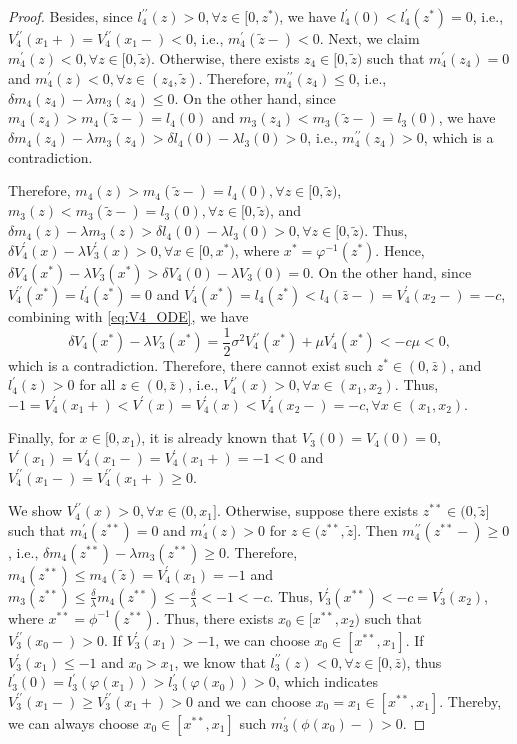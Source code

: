 \documentclass[11pt,reqno]{article}%
\numberwithin{equation}{section}
\begin{document}
\begin{proof}
Besides, since $l_4^{\prime\prime}(z)>0, \forall z\in[0,z^*)$, we have $l_4^{\prime}(0)<l_4^{\prime}(z^*)=0$, i.e., $V_4^{\prime\prime}(x_1+)=V_4^{\prime\prime}(x_1-)<0$, i.e., $m^\prime_4(\tilde z-)<0$. Next, we claim $m^\prime_4(z)<0, \forall z\in[0,\tilde z)$. Otherwise, there exists $z_4\in[0,\tilde z)$ such that $m_4^\prime(z_4)=0$ and $m_4^\prime(z)<0, \forall z\in(z_4,\tilde z)$. Therefore, $m_4^{\prime\prime}(z_4)\le 0$, i.e., $\delta m_4(z_4)-\lambda m_3(z_4)\le 0$. On the other hand, since $m_4(z_4)>m_4(\tilde z-)=l_4(0)$ and  $m_3(z_4)<m_3(\tilde z-)=l_3(0)$, we have $\delta m_4(z_4)-\lambda m_3(z_4)>\delta l_4(0)-\lambda l_3(0)>0$, i.e., $m_4^{\prime\prime}(z_4)> 0$, which is a contradiction. 

Therefore, $m_4(z)>m_4(\tilde z-)=l_4(0), \forall z\in[0,\tilde z)$, $m_3(z)<m_3(\tilde z-)=l_3(0), \forall z\in[0,\tilde z)$, and $\delta m_4(z)-\lambda m_3(z)>\delta l_4(0)-\lambda l_3(0)>0, \forall z\in[0,\tilde z)$. Thus, $\delta V_4^\prime(x)-\lambda V_3^\prime(x)>0, \forall x \in[0,x^*)$, where $x^* = \varphi^{-1}(z^*)$. Hence, $\delta V_4(x^*)-\lambda V_3(x^*)>\delta V_4(0)-\lambda V_3(0)=0$. On the other hand, since $V^{\prime\prime}_4(x^*)=l_4^{\prime}(z^*)=0$ and $V_4^{\prime}(x^*)=l_4(z^*)<l_4(\bar z-)=V_4^{\prime}(x_2-)=-c$, combining with \eqref{eq:V4_ODE}, we have
\begin{equation}\nonumber
\delta V_4(x^*)-\lambda V_3(x^*) = \frac{1}{2} \sigma^2 V_4^{\prime\prime}(x^*) + \mu  V^{\prime}_4(x^*)  < -c\mu<0,
\end{equation}
which is a contradiction. Therefore, there cannot exist such $z^* \in (0, \bar z)$, and $l_4^\prime(z) > 0$ for all $z \in (0, \bar z)$, i.e., $V_4^{\prime\prime}(x) > 0, \forall x\in(x_1,x_2)$. Thus, $-1=V^{\prime}_4(x_1+)<V^{\prime}(x)=V^{\prime}_4(x)<V^{\prime}_4(x_2-)=-c, \forall x\in(x_1,x_2)$.

Finally, for $x \in [0, x_1)$, it is already known that $V_3(0)=V_4(0)= 0$, $V^\prime(x_1)=V^\prime_4(x_1-) = V^\prime_4(x_1+)=-1 < 0$ and $V^{\prime\prime}_4(x_1-)=V^{\prime\prime}_4(x_1+)\ge 0$.

We show $V_4^{\prime\prime}(x)>0, \forall x\in(0,x_1]$. Otherwise, suppose there exists $z^{**} \in (0, \tilde z]$ such that $m_4^\prime(z^{**}) = 0$ and $m_4^\prime(z) > 0$ for $z \in (z^{**}, \tilde z]$.  Then $m_4^{\prime\prime}(z^{**}-) \ge 0$, i.e., $\delta m_4(z^{**})-\lambda m_3(z^{**})\ge 0$. Therefore, $m_4(z^{**})\le m_4(\tilde z)=V^\prime_4(x_1)=-1$ and $m_3(z^{**})\le \frac{\delta}{\lambda}m_4(z^{**})\le -\frac{\delta}{\lambda}<-1<-c$. Thus, $V_3^\prime(x^{**})<-c=V_3^\prime(x_2)$, where $x^{**} = \phi^{-1}(z^{**})$. Thus, there exists $x_0\in [x^{**},x_2)$ such that $V_3^{\prime\prime}(x_0-)>0$. If $V_3^\prime(x_1)>-1$, we can choose $x_0\in [x^{**},x_1]$. If $V_3^\prime(x_1)\le -1$ and $x_0> x_1$, we know that $l_3^{\prime\prime}(z)<0, \forall z\in[0,\bar z)$, thus $l_3^{\prime}(0)=l_3^{\prime}(\varphi(x_1))> l_3^{\prime}(\varphi(x_0))>0$, which indicates $V_3^{\prime\prime}(x_1-)\ge V_3^{\prime\prime}(x_1+)>0$ and we can choose $x_0=x_1 \in [x^{**},x_1]$. Thereby, we can always choose $x_0\in [x^{**},x_1]$ such $m^\prime_3(\phi(x_0)-)>0$.


\end{proof}
\end{document}
